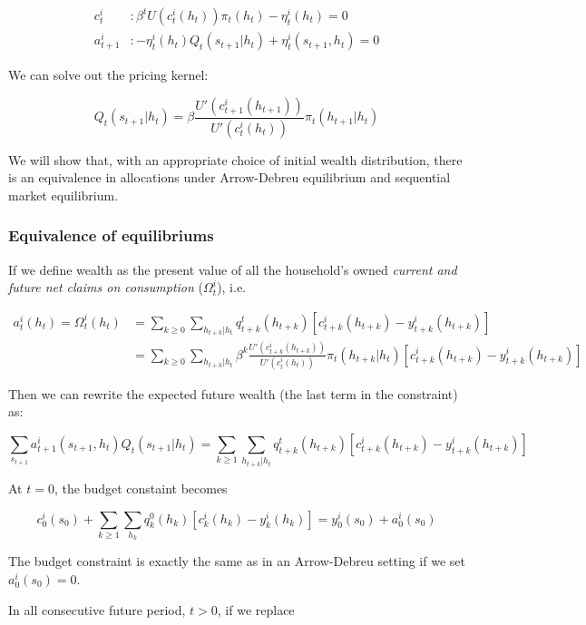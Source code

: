 \documentclass[10pt,a4]{article}
\begin{document}
\[
    \begin{aligned}
        c_t^i &: \beta^t U(c_t^i(h_t))\pi_t(h_t) -\eta_t^i(h_t) = 0 \\
        a_{t+1}^i &: -\eta_t^i(h_t)Q_t(s_{t+1}|h_t) + \eta_t^i(s_{t+1}, h_t) = 0
    \end{aligned}
\]

We can solve out the pricing kernel: 

$$ Q_t(s_{t+1}|h_t) = \beta\frac{U'(c_{t+1}^i(h_{t+1}))}{U'(c_t^i(h_t))}\pi_t(h_{t+1}|h_t) $$

We will show that, with an appropriate choice of initial wealth
distribution, there is an equivalence in allocations under Arrow-Debreu
equilibrium and sequential market equilibrium.

\par\null

\subsubsection{Equivalence of
equilibriums}

{\label{484195}}

If we define wealth as the present value of all the household's owned \emph{current and future net claims on consumption} ($\Omega_t^i$), i.e.

\[
    \begin{aligned}
      a_t^i(h_t) = \Omega_t^i(h_t) &= \sum_{k\ge 0}\sum_{h_{t+k}|h_t} q_{t+k}^t(h_{t+k})[c_{t+k}^i(h_{t+k}) - y_{t+k}^i(h_{t+k})] \\
      &= \sum_{k\ge 0}\sum_{h_{t+k}|h_t} \beta^k \frac{U'(c_{t+k}^i(h_{t+k}))}{U'(c_t^i(h_t))}\pi_t(h_{t+k}|h_t)[c_{t+k}^i(h_{t+k}) - y_{t+k}^i(h_{t+k})]
    \end{aligned}
\]

Then we can rewrite the expected future wealth (the last term in the constraint) as:

\[
\sum_{s_{t+1}}a_{t+1}^i(s_{t+1},h_t)Q_t(s_{t+1}|h_t) = \sum_{k\ge 1}\sum_{h_{t+k}|h_t} q_{t+k}^t(h_{t+k})[c_{t+k}^i(h_{t+k}) - y_{t+k}^i(h_{t+k})]
\]

At $t=0$, the budget constaint becomes

$$ c_0^i(s_0) + \sum_{k\ge 1}\sum_{h_k}q_k^0(h_k)[c_k^i(h_k)-y_k^i(h_k)] = y_0^i(s_0) + a_0^i(s_0) $$

The budget constraint is exactly the same as in an Arrow-Debreu setting if we set $a_0^i(s_0)=0$.

In all consecutive future period, $t>0$, if we replace 
\end{document}
